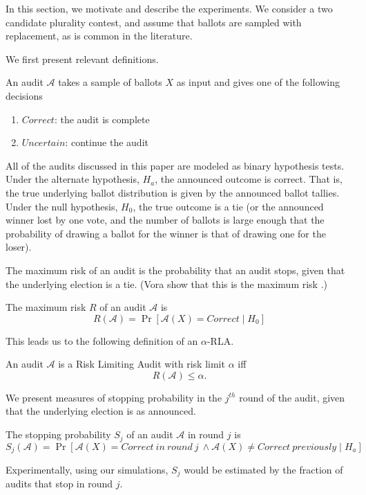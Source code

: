 In this section, we motivate and describe the experiments. We consider a two candidate plurality contest, and assume that ballots are sampled with replacement, as is common in the literature. 

We first present relevant definitions.

\begin{definition}
An audit $\mathcal{A}$ takes a sample of ballots $X$ as input and gives one of the 
following decisions
\begin{enumerate}
\item
$Correct$: the audit is complete
\item
$Uncertain$: continue the audit
\end{enumerate}
\end{definition}

All of the audits discussed in this paper are modeled as binary hypothesis tests. Under the alternate hypothesis, $H_a$, the announced outcome is correct. That is, the true underlying ballot distribution is given by the announced ballot tallies. Under the null hypothesis, $H_0$, the true outcome is a tie (or the announced winner lost by one vote, and the number of ballots is large enough that the probability of drawing a ballot for the winner is that of drawing one for the loser).

The maximum risk of an audit is the probability that an audit stops, given that the underlying election is a tie. (Vora show that this is the maximum risk \cite{Bayesian-RLA}.) 
\begin{definition}[Risk]
The maximum risk $R$ of an audit $\mathcal{A}$ is
$$R(\mathcal{A})=\Pr[\mathcal{A}(X)=Correct \mid H_0]$$
\end{definition}

This leads us to the following definition of an $\alpha$-RLA.
\begin{definition}
An audit $\mathcal{A}$ is a Risk Limiting Audit with 
risk limit $\alpha$ iff 
$$R(\mathcal{A}) \le \alpha.$$
\end{definition}

We present measures of stopping probability in the $j^{th}$ round of the audit, given that the underlying election is as announced.
\begin{definition}
The stopping probability $S_j$ of an audit $\mathcal{A}$ in round $j$ is 
$$S_j(\mathcal{A})=\Pr[\mathcal{A}(X)=Correct ~in~round~j~\land \mathcal{A}(X) \neq Correct ~previously \mid H_a]$$
\end{definition}
Experimentally, using our simulations, $S_j$ would be estimated by the fraction of audits that stop in round $j$. 

